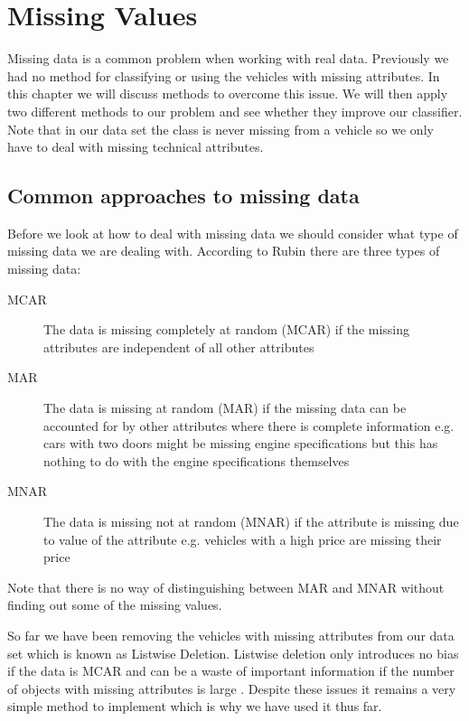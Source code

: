 \chapter{Missing Values}

Missing data is a common problem when working with real data.
Previously we had no method for classifying or using the vehicles with missing attributes.
In this chapter we will discuss methods to overcome this issue.
We will then apply two different methods to our problem and see whether they improve our classifier.
Note that in our data set the class is never missing from a vehicle so we only have to deal with missing technical attributes.

\section{Common approaches to missing data}

Before we look at how to deal with missing data we should consider what type of missing data we are dealing with.
According to Rubin \cite{Rubin76} there are three types of missing data:
\begin{description}
	\item[MCAR] The data is missing completely at random (MCAR) if the missing attributes are independent of all other  attributes
	\item[MAR] The data is missing at random (MAR) if the missing data can be accounted for by other attributes where there is complete information e.g. cars with two doors might be missing engine specifications but this has nothing to do with the engine specifications themselves
	\item[MNAR] The data is missing not at random (MNAR) if the attribute is missing due to value of the attribute e.g. vehicles with a high price are missing their price
\end{description}
Note that there is no way of distinguishing between MAR and MNAR without finding out some of the missing values.

So far we have been removing the vehicles with missing attributes from our data set which is known as Listwise Deletion.
Listwise deletion only introduces no bias if the data is MCAR \cite{Allison02} and can be a waste of important information if the number of objects with missing attributes is large \cite{Little92}.
Despite these issues it remains a very simple method to implement which is why we have used it thus far.

